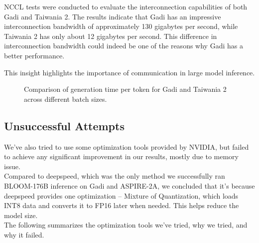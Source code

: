 NCCL tests were conducted to evaluate the interconnection capabilities of both Gadi and Taiwania 2. The results indicate that Gadi has an impressive interconnection bandwidth of approximately 130 gigabytes per second, while Taiwania 2 has only about 12 gigabytes per second. This difference in interconnection bandwidth could indeed be one of the reasons why Gadi has a better performance. 

This insight highlights the importance of communication in large model inference.


\begin{figure}[h!]
\centering
{}
\caption{Comparison of generation time per token for Gadi and Taiwania 2 across different batch sizes.}
\label{fig:exp_gadi_tw2}
\end{figure}


\subsection{Unsuccessful Attempts}
We've also tried to use some optimization tools provided by NVIDIA, but failed to achieve any significant improvement in our results, mostly due to memory issue.\\
Compared to deepspeed, which was the only method we successfully ran BLOOM-176B inference on Gadi and ASPIRE-2A, we concluded that it's because deepspeed provides one optimization -- Mixture of Quantization, which loads INT8 data and converts it to FP16 later when needed. This helps reduce the model size. \\
The following summarizes the optimization tools we've tried, why we tried, and why it failed.
